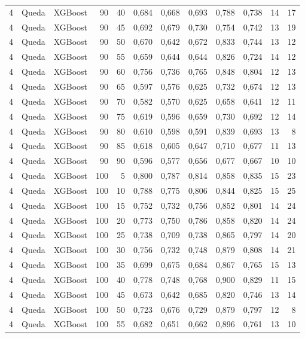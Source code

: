 \begin{longtable}{@{}rllrrrrrrrrr@{}}
4 & Queda & XGBoost & 90 & 40 & 0,684 & 0,668 & 0,693 & 0,788 & 0,738 & 14 & 17 \\
4 & Queda & XGBoost & 90 & 45 & 0,692 & 0,679 & 0,730 & 0,754 & 0,742 & 13 & 19 \\
4 & Queda & XGBoost & 90 & 50 & 0,670 & 0,642 & 0,672 & 0,833 & 0,744 & 13 & 12 \\
4 & Queda & XGBoost & 90 & 55 & 0,659 & 0,644 & 0,644 & 0,826 & 0,724 & 14 & 12 \\
4 & Queda & XGBoost & 90 & 60 & 0,756 & 0,736 & 0,765 & 0,848 & 0,804 & 12 & 13 \\
4 & Queda & XGBoost & 90 & 65 & 0,597 & 0,576 & 0,625 & 0,732 & 0,674 & 12 & 13 \\
4 & Queda & XGBoost & 90 & 70 & 0,582 & 0,570 & 0,625 & 0,658 & 0,641 & 12 & 11 \\
4 & Queda & XGBoost & 90 & 75 & 0,619 & 0,596 & 0,659 & 0,730 & 0,692 & 12 & 14 \\
4 & Queda & XGBoost & 90 & 80 & 0,610 & 0,598 & 0,591 & 0,839 & 0,693 & 13 & 8 \\
4 & Queda & XGBoost & 90 & 85 & 0,618 & 0,605 & 0,647 & 0,710 & 0,677 & 11 & 13 \\
4 & Queda & XGBoost & 90 & 90 & 0,596 & 0,577 & 0,656 & 0,677 & 0,667 & 10 & 10 \\
4 & Queda & XGBoost & 100 & 5 & 0,800 & 0,787 & 0,814 & 0,858 & 0,835 & 15 & 23 \\
4 & Queda & XGBoost & 100 & 10 & 0,788 & 0,775 & 0,806 & 0,844 & 0,825 & 15 & 25 \\
4 & Queda & XGBoost & 100 & 15 & 0,752 & 0,732 & 0,756 & 0,852 & 0,801 & 14 & 24 \\
4 & Queda & XGBoost & 100 & 20 & 0,773 & 0,750 & 0,786 & 0,858 & 0,820 & 14 & 24 \\
4 & Queda & XGBoost & 100 & 25 & 0,738 & 0,709 & 0,738 & 0,865 & 0,797 & 14 & 20 \\
4 & Queda & XGBoost & 100 & 30 & 0,756 & 0,732 & 0,748 & 0,879 & 0,808 & 14 & 21 \\
4 & Queda & XGBoost & 100 & 35 & 0,699 & 0,675 & 0,684 & 0,867 & 0,765 & 15 & 13 \\
4 & Queda & XGBoost & 100 & 40 & 0,778 & 0,748 & 0,768 & 0,900 & 0,829 & 11 & 15 \\
4 & Queda & XGBoost & 100 & 45 & 0,673 & 0,642 & 0,685 & 0,820 & 0,746 & 13 & 14 \\
4 & Queda & XGBoost & 100 & 50 & 0,723 & 0,676 & 0,729 & 0,879 & 0,797 & 12 & 8 \\
4 & Queda & XGBoost & 100 & 55 & 0,682 & 0,651 & 0,662 & 0,896 & 0,761 & 13 & 10 \\

\end{longtable}
